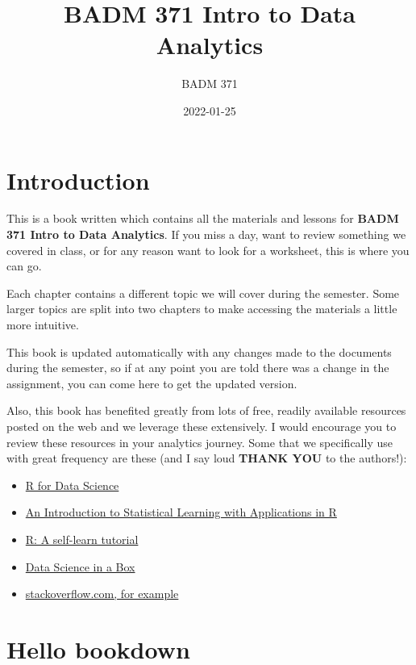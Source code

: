 \documentclass[
]{book}
\title{BADM 371 Intro to Data Analytics}
\author{BADM 371}
\date{2022-01-25}
\providecommand{\tightlist}{%
  \setlength{\itemsep}{0pt}\setlength{\parskip}{0pt}}
\begin{document}
\maketitle

{
\setcounter{tocdepth}{1}
\tableofcontents
}
\hypertarget{introduction}{%
\chapter{Introduction}\label{introduction}}

This is a book written which contains all the materials and lessons for \textbf{BADM 371 Intro to Data Analytics}. If you miss a day, want to review something we covered in class, or for any reason want to look for a worksheet, this is where you can go.

Each chapter contains a different topic we will cover during the semester. Some larger topics are split into two chapters to make accessing the materials a little more intuitive.

This book is updated automatically with any changes made to the documents during the semester, so if at any point you are told there was a change in the assignment, you can come here to get the updated version.

Also, this book has benefited greatly from lots of free, readily available resources posted on the web and we leverage these extensively. I would encourage you to review these resources in your analytics journey. Some that we specifically use with great frequency are these (and I say loud \textbf{THANK YOU} to the authors!):

\begin{itemize}
\tightlist
\item
  \href{https://r4ds.had.co.nz/}{R for Data Science}
\item
  \href{https://trevorhastie.github.io/ISLR/}{An Introduction to Statistical Learning with Applications in R}
\item
  \href{https://gsp.humboldt.edu/olm/R/Tutorials/BestFirstRTutorial.pdf}{R: A self-learn tutorial}
\item
  \href{https://datasciencebox.org/}{Data Science in a Box}
\item
  \href{https://stackoverflow.com/questions/4862178/remove-rows-with-all-or-some-nas-missing-values-in-data-frame?rq=1}{stackoverflow.com, for example}
\end{itemize}

\hypertarget{hello-bookdown}{%
\chapter{Hello bookdown}\label{hello-bookdown}}
\end{document}
